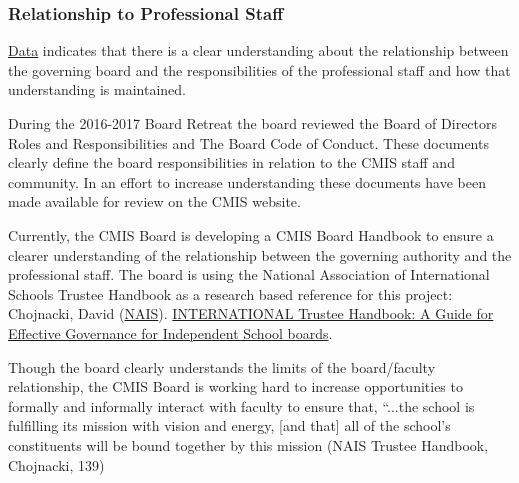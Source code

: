 \subsubsection{Relationship to Professional Staff}



\begin{findings}
\href{https://docs.google.com/a/cmis.ac.th/document/d/1_otvw47y3Z-1CSjXnKhgRTauVRqPl1S6nSdmsb00O2k/edit?usp=sharing}{Data} indicates that there is a clear understanding about the relationship between the governing board and the responsibilities of the professional staff and how that understanding is maintained. 

During the 2016-2017 Board Retreat the board reviewed the Board of Directors Roles and Responsibilities and The Board Code of Conduct. These documents clearly define the board responsibilities in relation to the CMIS staff and community. In an effort to increase understanding these documents have been made available for review on the CMIS website.

Currently, the CMIS Board is developing a CMIS Board Handbook to ensure a clearer understanding of the relationship between the governing authority and the professional staff. The board is using the National Association of International Schools Trustee Handbook as a research based reference for this project: Chojnacki, David (\href{http://www.nais.org/Articles/Pages/NAIS-Trustee-Handbook-Resources.aspx}{NAIS}). \href{https://www.nais.org/Bookstore/Pages/ProductDetail.aspx?productid=\%7B47CD9104-BC67-E111-9A8C-00505683000D\%7D}{INTERNATIONAL Trustee Handbook: A Guide for Effective Governance for Independent School boards}. 

Though the board clearly understands the limits of the board/faculty relationship, the CMIS Board is working hard to increase opportunities to formally and informally interact with faculty to ensure that, “...the school is fulfilling its mission with vision and energy, [and that]  all  of the school’s constituents will be bound together by this mission (NAIS Trustee Handbook, Chojnacki, 139)  


\end{findings}
